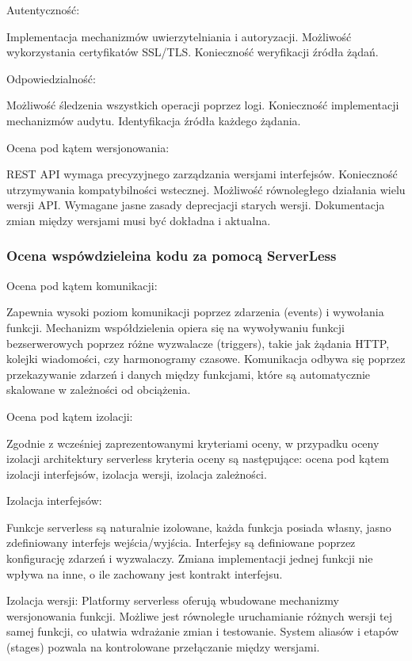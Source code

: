 \documentclass[runningheads,12pt]{llncs}
\begin{document}
Autentyczność: 

Implementacja mechanizmów uwierzytelniania i autoryzacji. Możliwość wykorzystania certyfikatów SSL/TLS. Konieczność weryfikacji źródła żądań. ~\cite[p. 289]{newman2015building}

Odpowiedzialność: 

Możliwość śledzenia wszystkich operacji poprzez logi. Konieczność implementacji mechanizmów audytu. Identyfikacja źródła każdego żądania. ~\cite[p. 312]{newman2015building}

Ocena pod kątem wersjonowania:

REST API wymaga precyzyjnego zarządzania wersjami interfejsów. Konieczność utrzymywania kompatybilności wstecznej. Możliwość równoległego działania wielu wersji API. Wymagane jasne zasady deprecjacji starych wersji. Dokumentacja zmian między wersjami musi być dokładna i aktualna. ~\cite[p. 134]{richardson2013rest}
\subsubsection{Ocena wspówdzieleina kodu za pomocą ServerLess}

Ocena pod kątem komunikacji: 

Zapewnia wysoki poziom komunikacji poprzez zdarzenia (events) i wywołania funkcji. Mechanizm współdzielenia opiera się na wywoływaniu funkcji bezserwerowych poprzez różne wyzwalacze (triggers), takie jak żądania HTTP, kolejki wiadomości, czy harmonogramy czasowe. Komunikacja odbywa się poprzez przekazywanie zdarzeń i danych między funkcjami, które są automatycznie skalowane w zależności od obciążenia. ~\cite[p. 45]{roberts2018cloud}

Ocena pod kątem izolacji:

Zgodnie z wcześniej zaprezentowanymi kryteriami oceny, w przypadku oceny izolacji architektury serverless kryteria oceny są następujące: ocena pod kątem izolacji interfejsów, izolacja wersji, izolacja zależności.

Izolacja interfejsów: 

Funkcje serverless są naturalnie izolowane, każda funkcja posiada własny, jasno zdefiniowany interfejs wejścia/wyjścia. Interfejsy są definiowane poprzez konfigurację zdarzeń i wyzwalaczy. Zmiana implementacji jednej funkcji nie wpływa na inne, o ile zachowany jest kontrakt interfejsu. ~\cite[p. 78]{roberts2018cloud}

Izolacja wersji: 
Platformy serverless oferują wbudowane mechanizmy wersjonowania funkcji. Możliwe jest równoległe uruchamianie różnych wersji tej samej funkcji, co ułatwia wdrażanie zmian i testowanie. System aliasów i etapów (stages) pozwala na kontrolowane przełączanie między wersjami. ~\cite[p. 112]{roberts2018cloud}
\end{document}
